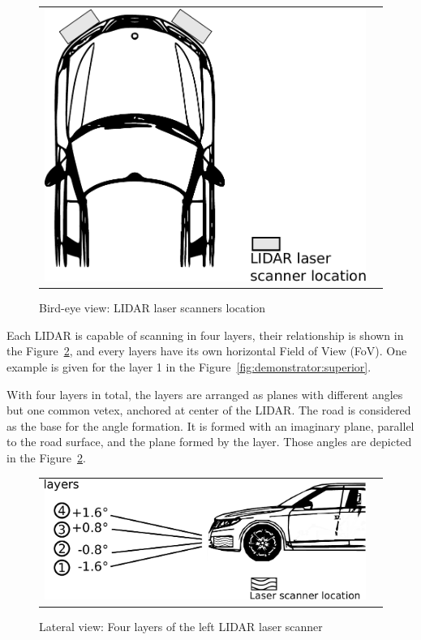 \begin{figure}[h]
   \centering
     \begin{tabular}{lr}
       \includegraphics[scale=0.3]{img/fig:demonstrator:birdeye}
     \end{tabular}
   \caption{Bird-eye view: LIDAR laser scanners location}
   \label{fig:demonstrator:birdeye}
\end{figure}

Each LIDAR is capable of scanning in four layers, their relationship is shown  in the Figure~\ref{fig:demonstrator:lateral}, and every layers have its own horizontal Field of View (FoV). One example is given for the layer 1 in the Figure~\ref{fig:demonstrator:superior}.

With four layers in total, the layers are arranged as planes with different angles but one common vetex, anchored at center of the LIDAR. The road is considered as the base for the angle formation. It is formed with an imaginary plane, parallel to the road surface, and the plane formed by the layer. Those angles are depicted in the Figure~\ref{fig:demonstrator:lateral}.

\begin{figure}[h]
   \centering
     \begin{tabular}{lr}
       \includegraphics[scale=0.5]{img/fig:demonstrator:lateral}
     \end{tabular}
   \caption{Lateral view: Four layers of the left LIDAR laser scanner}
   \label{fig:demonstrator:lateral}
\end{figure}


